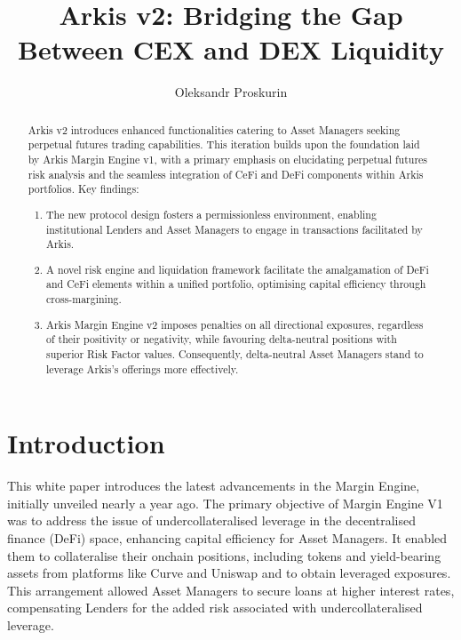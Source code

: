 \documentclass[conference]{IEEEtran}
\begin{document}
 
\title{Arkis v2: Bridging the Gap Between CEX and DEX Liquidity}
\author{Oleksandr Proskurin}

\maketitle
    \begin{abstract}
Arkis v2 introduces enhanced functionalities catering to Asset Managers seeking perpetual futures trading capabilities. This iteration builds upon the foundation laid by Arkis Margin Engine v1, with a primary emphasis on elucidating perpetual futures risk analysis and the seamless integration of CeFi and DeFi components within Arkis portfolios.
Key findings: 
\begin{enumerate}
  \item The new protocol design fosters a permissionless environment, enabling institutional Lenders and Asset Managers to engage in transactions facilitated by Arkis.
  \item A novel risk engine and liquidation framework facilitate the amalgamation of DeFi and CeFi elements within a unified portfolio, optimising capital efficiency through cross-margining.
  \item Arkis Margin Engine v2 imposes penalties on all directional exposures, regardless of their positivity or negativity, while favouring delta-neutral positions with superior Risk Factor values. Consequently, delta-neutral Asset Managers stand to leverage Arkis's offerings more effectively.
  \end{enumerate}
\end{abstract}



\section{Introduction}

This white paper introduces the latest advancements in the Margin Engine, initially unveiled nearly a year ago. The primary objective of Margin Engine V1 was to address the issue of undercollateralised leverage in the decentralised finance (DeFi) space, enhancing capital efficiency for Asset Managers. It enabled them to collateralise their onchain positions, including tokens and yield-bearing assets from platforms like Curve and Uniswap and to obtain leveraged exposures. This arrangement allowed Asset Managers to secure loans at higher interest rates, compensating Lenders for the added risk associated with undercollateralised leverage.\cite{arkis-v1-whitepaper}
\end{document}
